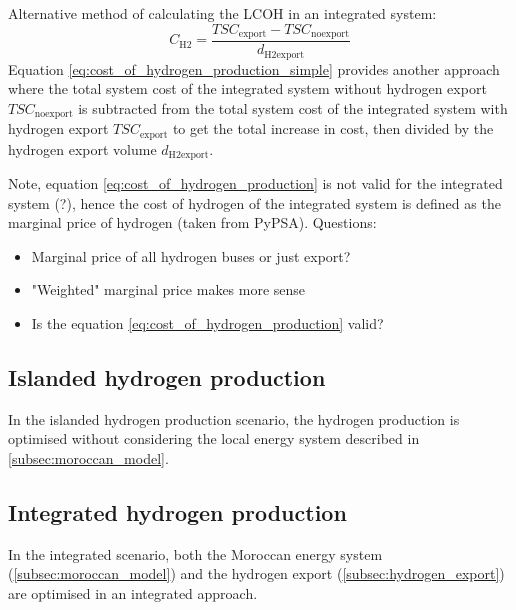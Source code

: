 Alternative method of calculating the LCOH in an integrated system:
\begin{equation}
    \label{eq:cost_of_hydrogen_production_simple}
    C_\mathrm{H2}=\frac{TSC_\mathrm{export}-TSC_\mathrm{noexport}}{d_\mathrm{H2export}}
\end{equation}
Equation \ref{eq:cost_of_hydrogen_production_simple} provides another approach where the total system cost of the integrated system without hydrogen export $TSC_\mathrm{noexport}$ is subtracted from the total system cost of the integrated system with hydrogen export $TSC_\mathrm{export}$ to get the total increase in cost, then divided by the hydrogen export volume $d_\mathrm{H2export}$.

Note, equation \ref{eq:cost_of_hydrogen_production} is not valid for the integrated system (?),
hence the cost of hydrogen of the integrated system is defined as the marginal price of hydrogen (taken from PyPSA).
Questions:
\begin{itemize}
    \item Marginal price of all hydrogen buses or just export?
    \item "Weighted" marginal price makes more sense
    \item Is the equation \ref{eq:cost_of_hydrogen_production} valid?
\end{itemize}


\subsection{Islanded hydrogen production}
In the islanded hydrogen production scenario, the hydrogen production is optimised without considering the local energy system described in \ref{subsec:moroccan_model}.


\subsection{Integrated hydrogen production}
In the integrated scenario, both the Moroccan energy system (\ref{subsec:moroccan_model}) and the hydrogen export (\ref{subsec:hydrogen_export})
are optimised in an integrated approach.